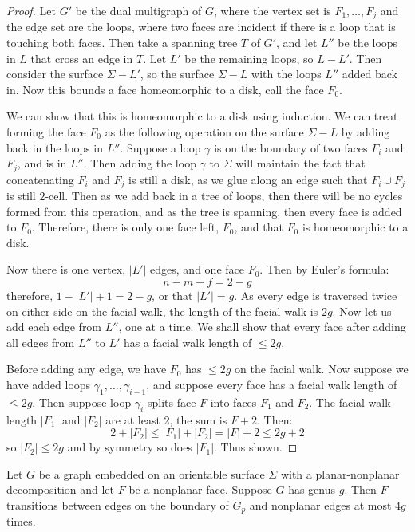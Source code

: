 \begin{proof}
	Let \(G'\) be the dual multigraph of $G$, where the vertex set is \(F_1, \ldots, F_j\) and the edge set are the loops, where two faces are incident if there is a loop that is touching both faces. Then take a spanning tree \(T\) of \(G'\), and let \(L''\) be the loops in $L$ that cross an edge in \(T\). Let $L'$ be the remaining loops, so $L - L'$. 
	Then consider the surface \(\Sigma - L'\), so the surface $\Sigma - L$ with the loops $L''$ added back in. Now this bounds a face homeomorphic to a disk, call the face \(F_0\). 
	
	We can show that this is homeomorphic to a disk using induction. We can treat forming the face $F_0$ as the following operation on the surface $\Sigma - L$ by adding back in the loops in $L''$. Suppose a loop $\gamma$ is on the boundary of two faces $F_i$ and $F_j$, and is in $L''$. Then adding the loop $\gamma$ to $\Sigma$ will maintain the fact that concatenating $F_i$ and $F_j$ is still a disk, as we glue along an edge such that $F_i \cup F_j$ is still $2$-cell. Then as we add back in a tree of loops, then there will be no cycles formed from this operation, and as the tree is spanning, then every face is added to $F_0$. Therefore, there is only one face left, $F_0$, and that $F_0$ is homeomorphic to a disk. 

	Now there is one vertex, \(|L'|\) edges, and one face \(F_0\). Then by Euler's formula:
	\begin{equation}
		n - m + f = 2 - g
	\end{equation}
	therefore, \(1 - |L'| + 1 = 2 - g\), or that \(|L'| = g\). As every edge is traversed twice on either side on the facial walk, the length of the facial walk is \(2g\).
	Now let us add each edge from \(L''\), one at a time. We shall show that every face after adding all edges from \(L''\) to \(L'\) has a facial walk length of \(\leq 2g\).

	Before adding any edge, we have \(F_0\) has \(\leq 2g\) on the facial walk. Now suppose we have added loops \(\gamma_1, \ldots, \gamma_{i - 1}\), and suppose every face has a facial walk length of \(\leq 2g\).
	Then suppose loop \(\gamma_i\) splits face \(F\) into faces \(F_1\) and \(F_2\). The facial walk length \(|F_1|\) and \(|F_2|\) are at least 2, the sum is \(F + 2\). Then:
	\begin{equation}
		2 + |F_2| \leq |F_1| + |F_2| = |F| + 2 \leq 2g + 2
	\end{equation}
	so \(|F_2| \leq 2g\) and by symmetry so does \(|F_1|\). Thus shown.
\end{proof}
\begin{corollary}\label{corr:orientable_nonplanar_faces}
	Let \(G\) be a graph embedded on an orientable surface \(\Sigma\) with a planar-nonplanar decomposition and let \(F\) be a nonplanar face. Suppose \(G\) has genus \(g\). Then \(F\) transitions between edges on the boundary of $G_p$ and nonplanar edges at most $4g$ times.
\end{corollary}

